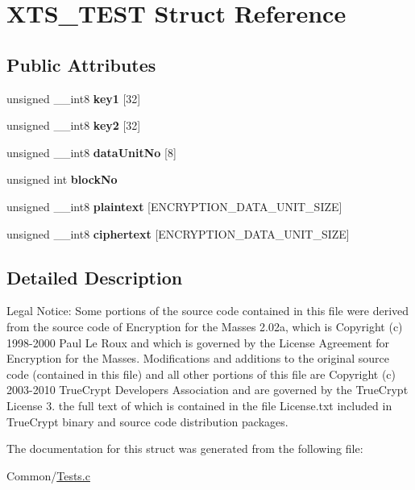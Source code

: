 \hypertarget{struct_x_t_s___t_e_s_t}{}\section{X\+T\+S\+\_\+\+T\+E\+ST Struct Reference}
\label{struct_x_t_s___t_e_s_t}
\subsection*{Public Attributes}
\begin{DoxyCompactItemize}
\item 
\mbox{\label{struct_x_t_s___t_e_s_t_a43fbb82e9560a24df6330f8bb1c7c2af}} 
unsigned \+\_\+\+\_\+int8 {\bfseries key1} \mbox{[}32\mbox{]}
\item 
\mbox{\label{struct_x_t_s___t_e_s_t_a2fe78d5b424651fa1ee2dcf3cc805cba}} 
unsigned \+\_\+\+\_\+int8 {\bfseries key2} \mbox{[}32\mbox{]}
\item 
\mbox{\label{struct_x_t_s___t_e_s_t_ac31997b9227afba6b49d696522df1a70}} 
unsigned \+\_\+\+\_\+int8 {\bfseries data\+Unit\+No} \mbox{[}8\mbox{]}
\item 
\mbox{\label{struct_x_t_s___t_e_s_t_a1d14677c84d6e9046768f0b25815b4ed}} 
unsigned int {\bfseries block\+No}
\item 
\mbox{\label{struct_x_t_s___t_e_s_t_a429fe3899f6ee849a7f34e18f99aeb16}} 
unsigned \+\_\+\+\_\+int8 {\bfseries plaintext} \mbox{[}E\+N\+C\+R\+Y\+P\+T\+I\+O\+N\+\_\+\+D\+A\+T\+A\+\_\+\+U\+N\+I\+T\+\_\+\+S\+I\+ZE\mbox{]}
\item 
\mbox{\label{struct_x_t_s___t_e_s_t_ad105a3323d1857b83f523a2e45618533}} 
unsigned \+\_\+\+\_\+int8 {\bfseries ciphertext} \mbox{[}E\+N\+C\+R\+Y\+P\+T\+I\+O\+N\+\_\+\+D\+A\+T\+A\+\_\+\+U\+N\+I\+T\+\_\+\+S\+I\+ZE\mbox{]}
\end{DoxyCompactItemize}


\subsection{Detailed Description}
Legal Notice\+: Some portions of the source code contained in this file were derived from the source code of Encryption for the Masses 2.\+02a, which is Copyright (c) 1998-\/2000 Paul Le Roux and which is governed by the \textquotesingle{}License Agreement for Encryption for the Masses\textquotesingle{}. Modifications and additions to the original source code (contained in this file) and all other portions of this file are Copyright (c) 2003-\/2010 True\+Crypt Developers Association and are governed by the True\+Crypt License 3. the full text of which is contained in the file License.\+txt included in True\+Crypt binary and source code distribution packages. 

The documentation for this struct was generated from the following file\+:\begin{DoxyCompactItemize}
\item 
Common/\hyperlink{_tests_8c}{Tests.\+c}\end{DoxyCompactItemize}
